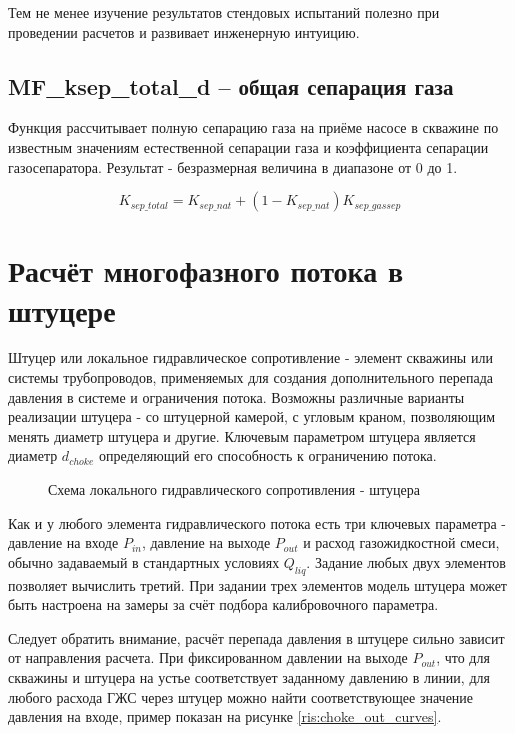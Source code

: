 Тем не менее изучение результатов стендовых испытаний полезно при проведении расчетов и развивает инженерную интуицию. 



\subsection{MF\_ksep\_total\_d – общая сепарация газа}

Функция рассчитывает полную сепарацию газа на приёме насосе в скважине по известным значениям естественной сепарации газа и коэффициента сепарации газосепаратора. Результат - безразмерная величина в диапазоне от 0 до 1. 

$$K_{sep\_total} = K_{sep\_nat} + (1-K_{sep\_nat}) K_{sep\_gassep}$$


\section{Расчёт многофазного потока в штуцере}


Штуцер или локальное гидравлическое сопротивление - элемент скважины или системы трубопроводов, применяемых для создания дополнительного перепада давления в системе и ограничения потока. 
Возможны различные варианты реализации штуцера - со штуцерной камерой, с угловым краном, позволяющим менять диаметр штуцера и другие.
Ключевым параметром штуцера является диаметр \(d_{choke} \) определяющий его способность к ограничению потока. 

\begin{figure}[h!]
	\begin{center}
	    
		\caption{Схема локального гидравлического сопротивления - штуцера}
		\label{ris:Pipe_choke}
	\end{center}
\end{figure}

Как и у любого элемента гидравлического потока есть три ключевых параметра - давление на входе \( P_{in} \), давление на выходе \(P_{out}\)  и расход газожидкостной смеси, обычно задаваемый в стандартных условиях \(Q_{liq} \). Задание любых двух элементов позволяет вычислить третий. При задании трех элементов модель штуцера может быть настроена на замеры за счёт подбора калибровочного параметра.

Следует обратить внимание, расчёт перепада давления в штуцере сильно зависит от направления расчета. При фиксированном давлении на выходе $P_{out}$, что для скважины и штуцера на устье соответствует заданному давлению в линии, для любого расхода ГЖС через штуцер можно найти соответствующее значение давления на входе, пример показан на рисунке \ref{ris:choke_out_curves}.
 
